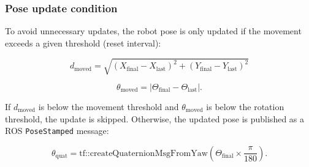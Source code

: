 \documentclass{CSSRforAfrica}
\begin{document}




\subsubsection*{Pose update condition}

To avoid unnecessary updates, the robot pose is only updated if the movement exceeds a given threshold (reset interval):

\begin{equation}
d_{\text{moved}} = \sqrt{(X_{\text{final}} - X_{\text{last}})^2 + (Y_{\text{final}} - Y_{\text{last}})^2}
\end{equation}

\begin{equation}
\theta_{\text{moved}} = |\Theta_{\text{final}} - \Theta_{\text{last}}|.
\end{equation}

If \( d_{\text{moved}} \) is below the movement threshold and \( \theta_{\text{moved}} \) is below the rotation threshold, the update is skipped. Otherwise, the updated pose is published as a ROS \texttt{PoseStamped} message:

\begin{equation}
\theta_{\text{quat}} = \text{tf::createQuaternionMsgFromYaw} \left( \Theta_{\text{final}} \times \frac{\pi}{180} \right).
\end{equation}
\end{document}
